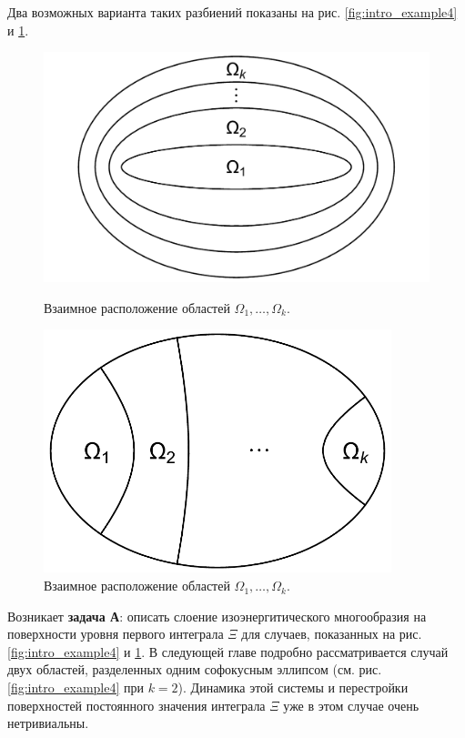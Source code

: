 Два возможных варианта таких разбиений показаны на рис. \ref{fig:intro_example4} и \ref{fig:intro_example5}. 
\begin{figure}[!htb]
   \includegraphics[width=1\textwidth]{images/ch4/section1/multiple ellipses.pdf}
    \caption{Взаимное расположение областей $\Omega_1, \ldots, \Omega_k$.}
    \label{fig:intro_example4}
\endminipage\hfill
{}
    \includegraphics[width=0.9\textwidth]{images/ch4/section1/multiple hyperbolas.pdf}   
    \caption{Взаимное расположение областей $\Omega_1, \ldots, \Omega_k$.}
    \label{fig:intro_example5}
\endminipage\hfill
\end{figure}
Возникает \textbf{задача А}:  описать слоение изоэнергитического многообразия на поверхности уровня первого интеграла $\Xi$ для случаев, показанных на рис. \ref{fig:intro_example4} и \ref{fig:intro_example5}. В следующей главе подробно рассматривается случай двух областей, разделенных одним софокусным эллипсом (см. рис. \ref{fig:intro_example4} при $k=2$). Динамика этой системы и перестройки поверхностей постоянного значения интеграла $\Xi$ уже в этом случае очень нетривиальны.

